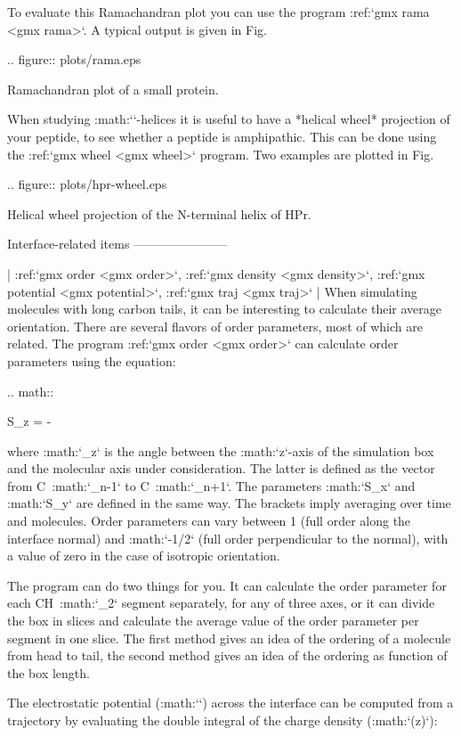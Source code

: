 To evaluate this Ramachandran plot you can use the program
:ref:`gmx rama <gmx rama>`. A typical output
is given in Fig.

.. figure:: plots/rama.eps 

    Ramachandran plot of a small protein.

When studying :math:`\alpha`-helices it is useful to have a *helical
wheel* projection of your peptide, to see whether a peptide is
amphipathic. This can be done using the :ref:`gmx wheel <gmx wheel>`
program. Two examples are plotted in
Fig. 

.. figure:: plots/hpr-wheel.eps

   Helical wheel projection of the N-terminal helix of HPr.

Interface-related items
-----------------------

| :ref:`gmx order <gmx order>`, :ref:`gmx density <gmx density>`, 
  :ref:`gmx potential <gmx potential>`, :ref:`gmx traj <gmx traj>`
| When simulating molecules with long carbon tails, it can be
  interesting to calculate their average orientation. There are several
  flavors of order parameters, most of which are related. The program
  :ref:`gmx order <gmx order>` can calculate
  order parameters using the equation:

.. math::

   S_{z} =  \rangle - 
   \label{eqn:Sgr}

where :math:`\theta_z` is the angle between the :math:`z`-axis of the
simulation box and the molecular axis under consideration. The latter is
defined as the vector from C\ :math:`_{n-1}` to C\ :math:`_{n+1}`. The
parameters :math:`S_x` and :math:`S_y` are defined in the same way. The
brackets imply averaging over time and molecules. Order parameters can
vary between 1 (full order along the interface normal) and :math:`-1/2`
(full order perpendicular to the normal), with a value of zero in the
case of isotropic orientation.

The program can do two things for you. It can calculate the order
parameter for each CH\ :math:`_2` segment separately, for any of three
axes, or it can divide the box in slices and calculate the average value
of the order parameter per segment in one slice. The first method gives
an idea of the ordering of a molecule from head to tail, the second
method gives an idea of the ordering as function of the box length.

The electrostatic potential (:math:`\psi`) across the interface can be
computed from a trajectory by evaluating the double integral of the
charge density (:math:`\rho(z)`):

